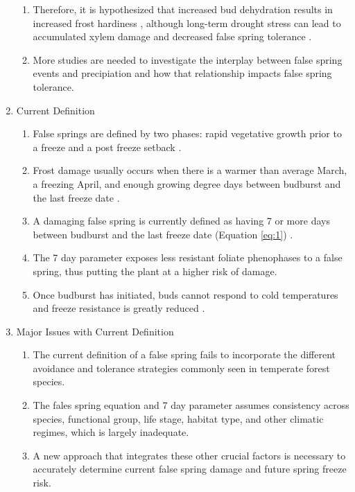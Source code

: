 \documentclass{article}\usepackage[]{graphicx}\usepackage[]{color}
\begin{document}
\begin{enumerate}
\begin {enumerate}
\item Therefore, it is hypothesized that increased bud dehydration results in increased frost hardiness \citep{Beck2007, Nielsen2009, Poirier2010, Kathke2011, Hofmann2015}, although long-term drought stress can lead to accumulated xylem damage and decreased false spring tolerance \citep{Anderegg2013}.
\item More studies are needed to investigate the interplay between false spring events and precipiation and how that relationship impacts false spring tolerance.
\end{enumerate}

\item Current Definition
\begin{enumerate}
\item False springs are defined by two phases: rapid vegetative growth prior to a freeze and a post freeze setback \citep{Gu2008}.
\item Frost damage usually occurs when there is a warmer than average March, a freezing April, and enough growing degree days between budburst and the last freeze date \citep{Augspurger2013}.
\item A damaging false spring is currently defined as having 7 or more days between budburst and the last freeze date (Equation \ref{eq:1}) \citep{Peterson2014}.
\item The 7 day parameter exposes less resistant foliate phenophases to a false spring, thus putting the plant at a higher risk of damage. 
\item Once budburst has initiated, buds cannot respond to cold temperatures and freeze resistance is greatly reduced \citep{Taschler2004, Lenz2013, Vitasse2014}.
\end{enumerate}

\item Major Issues with Current Definition
\begin{enumerate}
\item The current definition of a false spring fails to incorporate the different avoidance and tolerance strategies commonly seen in temperate forest species.
\item The fales spring equation and 7 day parameter assumes consistency across species, functional group, life stage, habitat type, and other climatic regimes, which is largely inadequate. 
\item A new approach that integrates these other crucial factors is necessary to accurately determine current false spring damage and future spring freeze risk. 
\end{enumerate}
\end{enumerate}
\end{document}
